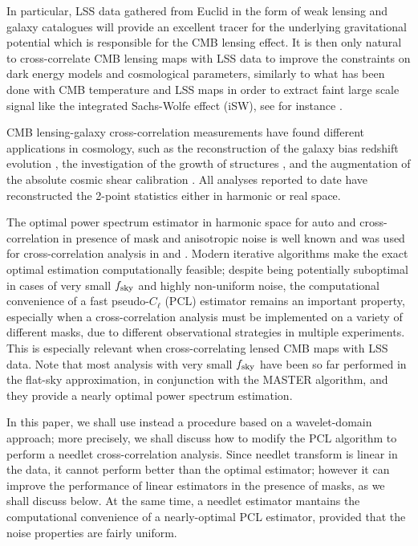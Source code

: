 \documentclass[a4paper,11pt]{article}
\begin{document}
In particular, LSS data gathered from Euclid in the form of weak lensing and galaxy catalogues will provide 
an excellent tracer for the underlying gravitational potential which is responsible for the CMB lensing effect.
It is then only natural to cross-correlate CMB lensing maps with LSS data to improve the
constraints on dark energy models and cosmological parameters, similarly to what has been done
with CMB temperature and LSS maps in order to extract faint large scale signal like the integrated 
Sachs-Wolfe effect (iSW), see for instance \cite{Pietrobon2006, Vielva2006, McEwen2007, Munshi:2014tua,Ade:2013dsi,Ade:2015dva}.

CMB lensing-galaxy cross-correlation measurements have found different applications in cosmology, such as the reconstruction of the galaxy bias redshift evolution \cite{Bianchini2015,Allison2015a,Bianchini2016}, the investigation of the growth of structures 
\cite{Giannantonio2016}, and the augmentation of the absolute cosmic shear calibration \cite{Baxter2016}. All 
analyses reported to date have reconstructed the 2-point statistics either in harmonic  or real space.

The optimal power spectrum estimator in harmonic space for auto and cross-correlation in presence of mask and anisotropic noise is well known \cite{Tegmark1997} and was used for cross-correlation analysis in \cite{Smith2007} and \cite{Schiavon2013}. Modern iterative algorithms make the exact optimal estimation computationally feasible; despite being potentially suboptimal in cases of very small $f_{\rm sky}$ and highly non-uniform noise, the computational convenience of a fast pseudo-$C_\ell$ (PCL) estimator remains an important property, especially when a cross-correlation analysis must be implemented on a variety of different masks, due to different observational strategies in multiple experiments. This is especially relevant when cross-correlating lensed CMB maps with LSS data. Note that most analysis with very small $f_{\rm sky}$ have been so far performed in the flat-sky approximation, in conjunction with the MASTER algorithm, and they provide a nearly optimal power spectrum estimation. 

In this paper, we shall use instead a procedure based on a wavelet-domain approach; more precisely, we shall discuss how to modify the PCL algorithm to perform a needlet cross-correlation analysis.
Since needlet transform is linear in the data, it cannot perform better than the optimal estimator; however it can improve the performance of linear estimators in the presence of masks, as we shall discuss below. At the same time, a needlet estimator mantains the computational convenience of a  nearly-optimal PCL estimator, provided that the noise properties are fairly uniform.
\end{document}
